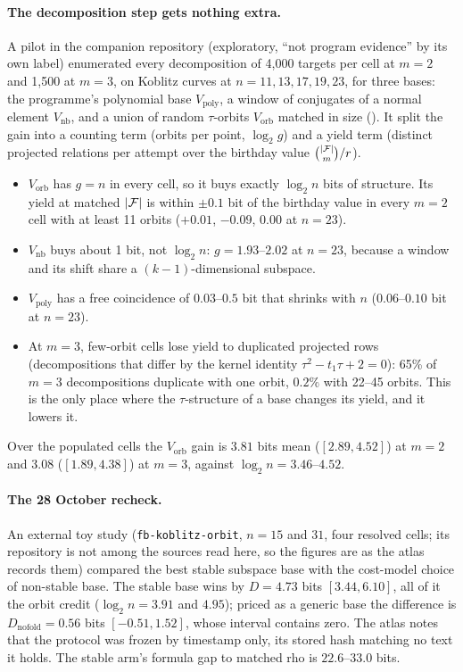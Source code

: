 \paragraph{The decomposition step gets nothing extra.} A pilot in the
companion repository (exploratory, ``not program evidence'' by its own
label) enumerated every decomposition of 4{,}000 targets per cell at $m=2$
and 1{,}500 at $m=3$, on Koblitz curves at $n=11,13,17,19,23$, for three
bases: the programme's polynomial base $V_{\text{poly}}$, a window of
conjugates of a normal element $V_{\text{nb}}$, and a union of random
$\tau$-orbits $V_{\text{orb}}$ matched in size
().
It split the gain into a counting term (orbits per point, $\log_2 g$) and a
yield term (distinct projected relations per attempt over the birthday value
$\binom{\lvert \mathcal{F} \rvert}{m}/r$).
\begin{itemize}
\item $V_{\text{orb}}$ has $g=n$ in every cell, so it buys exactly
  $\log_2n$ bits of structure. Its yield at matched $\lvert \mathcal{F} \rvert$ is within
  $\pm0.1$ bit of the birthday value in every $m=2$ cell with at least 11
  orbits ($+0.01$, $-0.09$, $0.00$ at $n=23$).
\item $V_{\text{nb}}$ buys about 1 bit, not $\log_2n$: $g=1.93$--$2.02$ at
  $n=23$, because a window and its shift share a $(k-1)$-dimensional
  subspace.
\item $V_{\text{poly}}$ has a free coincidence of $0.03$--$0.5$ bit that
  shrinks with $n$ ($0.06$--$0.10$ bit at $n=23$).
\item At $m=3$, few-orbit cells lose yield to duplicated projected rows
  (decompositions that differ by the kernel identity $\tau^2-t_1\tau+2=0$):
  65\% of $m=3$ decompositions duplicate with one orbit, $0.2\%$ with
  22--45 orbits. This is the only place where the $\tau$-structure of a base
  changes its yield, and it lowers it.
\end{itemize}
Over the populated cells the $V_{\text{orb}}$ gain is $3.81$ bits mean
($[2.89,4.52]$) at $m=2$ and $3.08$ ($[1.89,4.38]$) at $m=3$, against
$\log_2n=3.46$--$4.52$.

\paragraph{The 28 October recheck.} An external toy study
(\texttt{fb-koblitz-orbit}, $n=15$ and $31$, four resolved cells; its
repository is not among the sources read here, so the figures are as the
atlas records them) compared the best stable subspace base with the
cost-model choice of non-stable base. The stable base wins by $D=4.73$
bits $[3.44,6.10]$, all of it the orbit credit ($\log_2n=3.91$ and $4.95$);
priced as a generic base the difference is $D_{\text{nofold}}=0.56$ bits
$[-0.51,1.52]$, whose interval contains zero. The atlas notes that the
protocol was frozen by timestamp only, its stored hash matching no text it
holds. The stable arm's formula gap to matched rho is $22.6$--$33.0$ bits.

